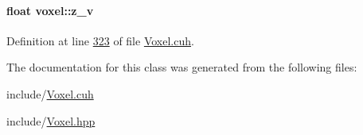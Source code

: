 \paragraph[{\texorpdfstring{z\+\_\+v}{z_v}}]{\setlength{\rightskip}{0pt plus 5cm}float voxel\+::z\+\_\+v}\hypertarget{classvoxel_a66addb3e42303e4a90a745c2174b0043}{}\label{classvoxel_a66addb3e42303e4a90a745c2174b0043}


Definition at line \hyperlink{Voxel_8cuh_source_l00323}{323} of file \hyperlink{Voxel_8cuh_source}{Voxel.\+cuh}.



The documentation for this class was generated from the following files\+:\begin{DoxyCompactItemize}
\item 
include/\hyperlink{Voxel_8cuh}{Voxel.\+cuh}\item 
include/\hyperlink{Voxel_8hpp}{Voxel.\+hpp}\end{DoxyCompactItemize}
